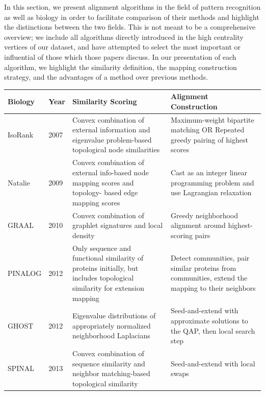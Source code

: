 \documentclass[12pt]{thesis}
\theoremstyle{plain}
\theoremstyle{definition}
\theoremstyle{remark}
\begin{document}
In this section, we present alignment algorithms in the field of pattern recognition as well as biology in order to facilitate comparison of their methods and highlight the distinctions between the two fields. This is not meant to be a comprehensive overview; we include all algorithms directly introduced in the high centrality vertices of our dataset, and have attempted to select the most important or influential of those which those papers discuss. In our presentation of each algorithm, we highlight the similarity definition, the mapping construction strategy, and the advantages of a method over previous methods.


\begin{table}[!hp]
\centering
{\fontsize{11}{13}\selectfont
\begin{tabular}{|L{0.2\textwidth}|L{0.055\textwidth}|L{0.33\textwidth}|L{0.31\textwidth}|}
\hline
\textbf{Biology} & \textbf{Year} & \textbf{Similarity Scoring} & \textbf{Alignment Construction} \\ \hline\hline
IsoRank \cite{Singh_2007} & 2007 & Convex combination of external information and eigenvalue problem-based topological node similarities  & Maximum-weight bipartite matching OR Repeated greedy pairing of highest scores \\ \hline

Natalie \cite{Klau_2009} & 2009 & Convex combination of external info-based node mapping scores and topology- based edge mapping scores & Cast as an integer linear programming problem and use Lagrangian relaxation \\ \hline

GRAAL \cite{Kuchaiev_2010} & 2010 & Convex combination of graphlet signatures and local density & Greedy neighborhood alignment around highest-scoring pairs \\ \hline

PINALOG \cite{phan2012pinalog} & 2012 & Only sequence and functional similarity of proteins initially, but includes topological similarity for extension mapping & Detect communities, pair similar proteins from communities, extend the mapping to their neighbors  \\ \hline

GHOST \cite{Patro_2012} & 2012 & Eigenvalue distributions of appropriately normalized neighborhood Laplacians & Seed-and-extend with approximate solutions to the QAP, then local search step \\ \hline

SPINAL \cite{aladaug2013spinal} & 2013 & Convex combination of sequence similarity and neighbor matching-based topological similarity  & Seed-and-extend with local swaps \\ \hline


\end{tabular}}
\end{table}
\end{document}

